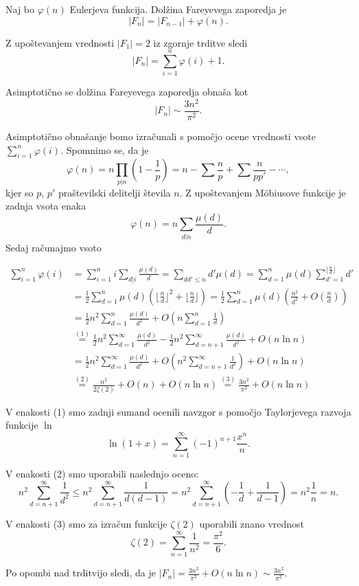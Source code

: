\documentclass[mat1]{fmfdelo}
\begin{document}
\begin{trditev}
Naj bo $\varphi(n)$ Eulerjeva funkcija. Dolžina Fareyevega zaporedja je
\[  |F_{n}| = |F_{n-1}| + \varphi(n). \]
\end{trditev}

\begin{opomba}
Z upoštevanjem vrednosti $|F_{1}| = 2$ iz zgornje trditve sledi \[  |F_{n}| = \sum_{i=1}^n \varphi(i) + 1. \]
\end{opomba}

\begin{trditev}
Asimptotično se dolžina Fareyevega zaporedja obnaša kot
\[  |F_{n}|\sim\frac{3n^2}{\pi^2}. \]
\end{trditev}

\begin{dokaz}
Asimptotično obnašanje bomo izračunali s pomočjo ocene vrednosti vsote \( \sum_{i=1}^n \varphi(i) \).
Spomnimo se, da je \[ \varphi(n) = n \prod_{p|n} (1 - \frac{1}{p}) = n - \sum \frac{n}{p} + \sum \frac{n}{pp'} - \cdots , \]
kjer so $p$, $p'$ praštevilski delitelji števila $n$.  Z upoštevanjem M\"obiusove funkcije je zadnja vsota enaka
\[ \varphi(n) = n \sum_{d|n} \frac{\mu(d)}{d} .\]
Sedaj računajmo vsoto 

\begin{align*}
\sum_{i=1}^n \varphi(i)
  &= \sum_{i=1}^n i \sum_{d|i} \frac{\mu(d)}{d} = \sum_{dd'\leq n}d' \mu(d) = 
    \sum_{d=1}^n \mu(d) \sum_{d'=1}^{\lfloor \frac{n}{d} \rfloor} d' \\
  &= \frac{1}{2} \sum_{d=1}^{n} \mu(d) (\lfloor \frac{n}{d} \rfloor ^2 + \lfloor \frac{n}{d} \rfloor) =
    \frac{1}{2} \sum_{d=1}^{n} \mu(d) (\frac{n^2}{d^2} + O(\frac{n}{d})) \\
  &= \frac{1}{2}n^2 \sum_{d=1}^{n} \frac{\mu(d)}{d^2} + O(n \sum_{d=1}^{n} \frac{1}{d}) \\
  &\stackrel{(1)}{=} \frac{1}{2}n^2 \sum_{d=1}^{\infty} \frac{\mu(d)}{d^2} - \frac{1}{2}n^2 \sum_{d=n+1}^{\infty} \frac{\mu(d)}{d^2} + O(n \ln{n}) \\
  &= \frac{1}{2}n^2 \sum_{d=1}^{\infty} \frac{\mu(d)}{d^2} + O(n^2\sum_{d=n+1}^{\infty} \frac{1}{d^2}) + O(n \ln{n}) \\
  & \stackrel{(2)}{=} \frac{n^2}{2 \zeta(2)} + O(n) + O(n \ln{n}) \stackrel{(3)}{=} \frac{3n^2}{\pi^2} + O(n \ln{n})
\end{align*}

V enakosti (1) smo zadnji sumand ocenili navzgor s pomočjo Taylorjevega razvoja funkcije $\ln$
\[ \ln{(1+x)} = \sum_{n=1}^{\infty} (-1)^{n+1} \frac{x^n}{n}.\]

V enakosti (2) smo uporabili naslednjo oceno:
\[ n^2 \sum_{d=n+1}^{\infty} \frac{1}{d^2} \leq n^2 \sum_{d=n+1}^{\infty} \frac{1}{d(d-1)} = 
n^2 \sum_{d=n+1}^{\infty} (- \frac{1}{d} + \frac{1}{d-1}) = n^2 \frac{1}{n} = n.\]

V enakosti (3) smo za izračun funkcije $\zeta(2)$ uporabili znano vrednost
\[ \zeta(2) = \sum_{n=1}^{\infty} \frac{1}{n^2} = \frac{\pi^2}{6}.\]

Po opombi nad trditvijo sledi, da je \(|F_n| = \frac{3n^2}{\pi^2} + O(n \ln{n}) \sim\frac{3n^2}{\pi^2}. \)
 
\end{dokaz}
\end{document}
